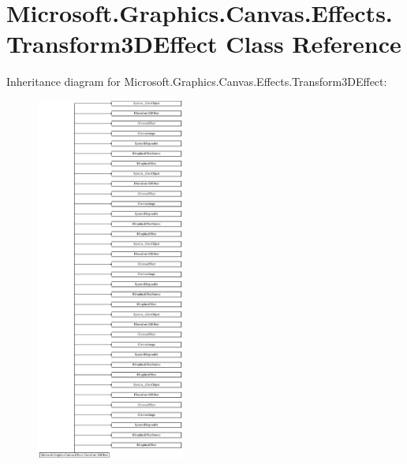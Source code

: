 \hypertarget{class_microsoft_1_1_graphics_1_1_canvas_1_1_effects_1_1_transform3_d_effect}{}\section{Microsoft.\+Graphics.\+Canvas.\+Effects.\+Transform3\+D\+Effect Class Reference}
\label{class_microsoft_1_1_graphics_1_1_canvas_1_1_effects_1_1_transform3_d_effect}
Inheritance diagram for Microsoft.\+Graphics.\+Canvas.\+Effects.\+Transform3\+D\+Effect\+:\begin{figure}[H]
\begin{center}
\leavevmode
\includegraphics[height=12.000000cm]{class_microsoft_1_1_graphics_1_1_canvas_1_1_effects_1_1_transform3_d_effect}
\end{center}
\end{figure}
